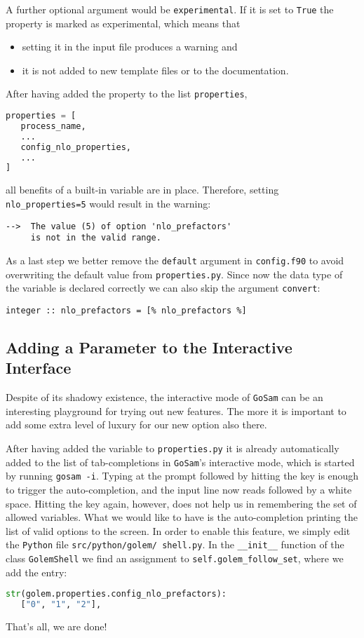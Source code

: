 \documentclass[11pt,a4paper]{refrep}
\newcommand{\golem}{{\tt GoSam}\xspace}
\newcommand{\python}{{\tt Python}\xspace}
\begin{document}
A further optional argument would be \texttt{experimental}.
If it is set to \texttt{True} the property is marked as experimental,
which means that
\begin{itemize}
\item setting it in the input file produces a warning and
\item it is not added to new template files or to the documentation.
\end{itemize}

After having added the property to the list \texttt{properties},
\begin{lstlisting}[language=Python]
properties = [
   process_name,
   ...
   config_nlo_properties,
   ...
]
\end{lstlisting}
all benefits of a built-in variable are in place. Therefore,
setting \texttt{nlo\_properties=5} would result in the warning:
\begin{verbatim}
-->  The value (5) of option 'nlo_prefactors'
     is not in the valid range.
\end{verbatim}

As a last step we better remove the \texttt{default} argument in
\texttt{config.f90} to avoid overwriting the default value from
\texttt{properties.py}. Since now the data type of the variable
is declared correctly we can also skip the argument \texttt{convert}:
\begin{lstlisting}
integer :: nlo_prefactors = [% nlo_prefactors %]
\end{lstlisting}

\subsection{Adding a Parameter to the Interactive Interface}
Despite of its shadowy existence, the interactive mode of \golem{}
can be an interesting playground for trying out new features.
The more it is important to add some extra level of luxury for our
new option also there.

After having added the variable to \texttt{properties.py} it is already
automatically added to the list of tab-completions in \golem{}'s interactive
mode, which is started by running \texttt{gosam -i}.
Typing  at the prompt followed by hitting the  key is
enough to trigger the auto-completion, and the input line now reads
 followed by a white space. Hitting the  key
again, however, does not help us in remembering the set of allowed variables.
What we would like to have is the auto-completion printing the list of
valid options to the screen. In order to enable this feature, we simply
edit the \python{} file
\texttt{src/\hspace{0pt}python/\hspace{0pt}golem/\hspace{0pt}%
shell.py}. In the \texttt{\_\_init\_\_} function of the class
\texttt{GolemShell} we find an assignment to
\texttt{self.golem\_follow\_set}, where we add the entry:
\begin{lstlisting}[language=Python]
str(golem.properties.config_nlo_prefactors):
   ["0", "1", "2"],
\end{lstlisting}
That's all, we are done!
\end{document}
